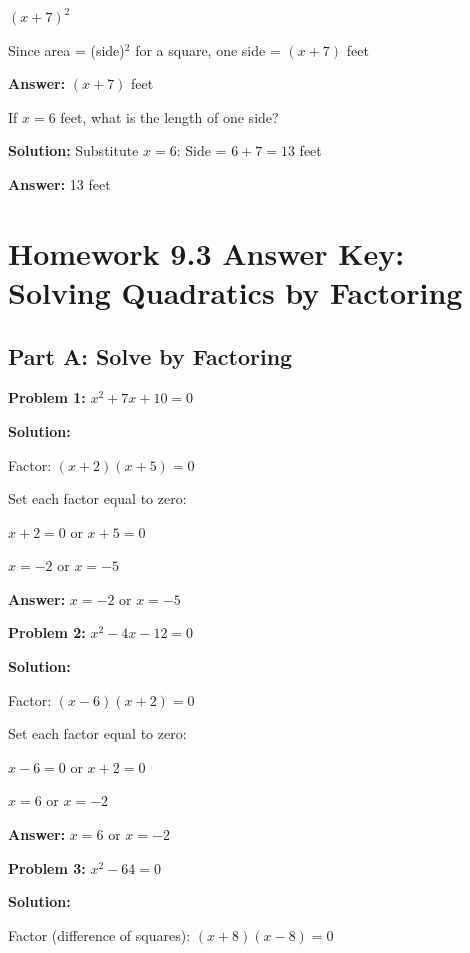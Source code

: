\documentclass[12pt]{article}
\begin{document}
		$(x + 7)^2$
		
		Since area = (side)$^2$ for a square, one side = $(x + 7)$ feet
		
		\textbf{Answer:} $(x + 7)$ feet

		\vspace{0.5cm}

		If $x = 6$ feet, what is the length of one side?
		
		\textbf{Solution:} Substitute $x = 6$: Side = $6 + 7 = 13$ feet
		
		\textbf{Answer:} 13 feet

\newpage

\section*{Homework 9.3 Answer Key: Solving Quadratics by Factoring}

	\subsection*{Part A: Solve by Factoring}

		\textbf{Problem 1:} $x^2 + 7x + 10 = 0$
		
		\textbf{Solution:}
		
		Factor: $(x + 2)(x + 5) = 0$
		
		Set each factor equal to zero:
		
		$x + 2 = 0$ or $x + 5 = 0$
		
		$x = -2$ or $x = -5$
		
		\textbf{Answer:} $x = -2$ or $x = -5$

		\vspace{0.5cm}

		\textbf{Problem 2:} $x^2 - 4x - 12 = 0$
		
		\textbf{Solution:}
		
		Factor: $(x - 6)(x + 2) = 0$
		
		Set each factor equal to zero:
		
		$x - 6 = 0$ or $x + 2 = 0$
		
		$x = 6$ or $x = -2$
		
		\textbf{Answer:} $x = 6$ or $x = -2$

		\vspace{0.5cm}

		\textbf{Problem 3:} $x^2 - 64 = 0$
		
		\textbf{Solution:}
		
		Factor (difference of squares): $(x + 8)(x - 8) = 0$
		
\end{document}
